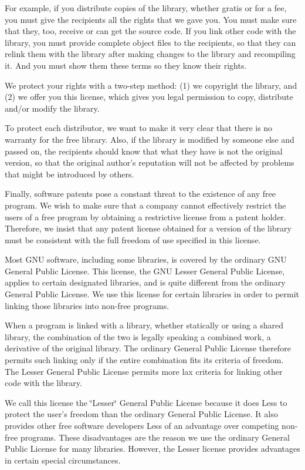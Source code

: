For example, if you distribute copies of the library, whether gratis or for a fee, you must give the recipients all the rights that we gave you. You must make sure that they, too, receive or can get the source code. If you link other code with the library, you must provide complete object files to the recipients, so that they can relink them with the library after making changes to the library and recompiling it. And you must show them these terms so they know their rights.

We protect your rights with a two-\/step method\-: (1) we copyright the library, and (2) we offer you this license, which gives you legal permission to copy, distribute and/or modify the library.

To protect each distributor, we want to make it very clear that there is no warranty for the free library. Also, if the library is modified by someone else and passed on, the recipients should know that what they have is not the original version, so that the original author's reputation will not be affected by problems that might be introduced by others.

Finally, software patents pose a constant threat to the existence of any free program. We wish to make sure that a company cannot effectively restrict the users of a free program by obtaining a restrictive license from a patent holder. Therefore, we insist that any patent license obtained for a version of the library must be consistent with the full freedom of use specified in this license.

Most G\-N\-U software, including some libraries, is covered by the ordinary G\-N\-U General Public License. This license, the G\-N\-U Lesser General Public License, applies to certain designated libraries, and is quite different from the ordinary General Public License. We use this license for certain libraries in order to permit linking those libraries into non-\/free programs.

When a program is linked with a library, whether statically or using a shared library, the combination of the two is legally speaking a combined work, a derivative of the original library. The ordinary General Public License therefore permits such linking only if the entire combination fits its criteria of freedom. The Lesser General Public License permits more lax criteria for linking other code with the library.

We call this license the \char`\"{}\-Lesser\char`\"{} General Public License because it does Less to protect the user's freedom than the ordinary General Public License. It also provides other free software developers Less of an advantage over competing non-\/free programs. These disadvantages are the reason we use the ordinary General Public License for many libraries. However, the Lesser license provides advantages in certain special circumstances.

